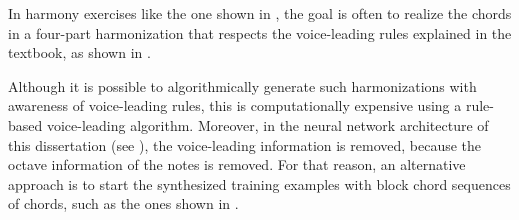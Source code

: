 
In harmony exercises like the one shown in
, the goal is often to
\gls{realize} the chords in a four-part harmonization that
respects the voice-leading rules explained in the textbook,
as shown in . 


Although it is possible to algorithmically generate such
harmonizations with awareness of voice-leading rules, this
is computationally expensive using a rule-based
voice-leading
algorithm.
Moreover, in the neural network architecture of this
dissertation (see ), the voice-leading
information is removed, because the octave information of
the notes is removed. For that reason, an alternative
approach is to start the synthesized training examples with
block chord sequences of chords, such as the ones shown in
.


